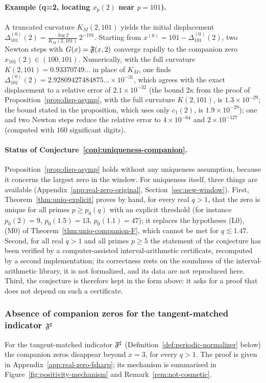 \paragraph{Example (q=2, locating $x_p(2)$ near $p=101$).}
A truncated curvature \(K_M(2,101)\) yields the initial displacement \(\Delta^{(0)}_{101}(2)=\frac{\log 2}{K_M(2,101)}\,2^{-101}\). Starting from \(x^{(0)}=101-\Delta^{(0)}_{101}(2)\), two Newton steps with \(G(x)=\mathfrak F(x,2)\) converge rapidly to the companion zero \(x_{101}(2)\in(100,101)\). Numerically, with the full curvature $K(2,101)=0.93370749\ldots$ in place of $K_M$, one finds $\Delta^{(0)}_{101}(2)=2.92809427484875\ldots\times10^{-31}$, which agrees with the exact displacement to a relative error of $2.1\times10^{-32}$ (the bound $2\kappa$ from the proof of Proposition~\ref{prop:disp-asymp}, with the full curvature $K(2,101)$, is $1.3\times10^{-29}$; the bound stated in the proposition, which uses only $c_1(2)$, is $1.9\times10^{-29}$); one and two Newton steps reduce the relative error to $4\times10^{-64}$ and $2\times10^{-127}$ (computed with $160$ significant digits).

\paragraph{Status of Conjecture~\ref{conj:uniqueness-companion}.}
Proposition~\ref{prop:disp-asymp} holds without any uniqueness assumption, because it concerns the largest zero in the window. For uniqueness itself, three things are available (Appendix~\ref{app:real-zero-original}, Section~\ref{sec:new-window}). First, Theorem~\ref{thm:uniq-explicit} proves by hand, for every real $q>1$, that the zero is unique for all primes $p\ge p_0(q)$ with an explicit threshold (for instance $p_0(2)=9$, $p_0(1.5)=13$, $p_0(1.1)=47$); it replaces the hypotheses (L0), (M0) of Theorem~\ref{thm:uniq-companion-F}, which cannot be met for $q\lesssim1.47$. Second, for all real $q>1$ and all primes $p\ge5$ the statement of the conjecture has been verified by a computer-assisted interval-arithmetic certificate, recomputed by a second implementation; its correctness rests on the soundness of the interval-arithmetic library, it is not formalized, and its data are not reproduced here. Third, the conjecture is therefore kept in the form above: it asks for a proof that does not depend on such a certificate.

\subsubsection{Absence of companion zeros for the tangent-matched indicator $\mathfrak F^{\sharp}$}\label{sec:no-companions-Fsharp}
For the tangent-matched indicator $\mathfrak F^{\sharp}$ (Definition~\ref{def:periodic-normalizer} below) the companion zeros disappear beyond $x=3$, for every $q>1$. The proof is given in Appendix~\ref{app:real-zero-fsharp}; its mechanism is summarised in Figure~\ref{fig:positivity-mechanism} and Remark~\ref{rem:not-cosmetic}.

